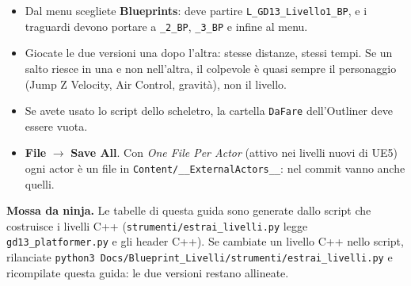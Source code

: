 \documentclass[a4paper,10pt]{article}
\newcommand{\nodo}[1]{\textsf{\textbf{#1}}}
\newcommand{\var}[1]{\texttt{#1}}
\newcommand{\ninja}[1]{\par\smallskip\noindent\colorbox{black!6}{\parbox{\dimexpr\linewidth-2\fboxsep}{\small\textbf{Mossa da ninja.} #1}}\par\smallskip}
\begin{document}
\begin{itemize}
  \item Dal menu scegliete \textbf{Blueprints}: deve partire \var{L\_GD13\_Livello1\_BP}, e i traguardi devono portare a \var{\_2\_BP}, \var{\_3\_BP} e infine al menu.
  \item Giocate le due versioni una dopo l'altra: stesse distanze, stessi tempi. Se un salto riesce in una e non nell'altra, il colpevole è quasi sempre il personaggio (Jump Z Velocity, Air Control, gravità), non il livello.
  \item Se avete usato lo script dello scheletro, la cartella \texttt{DaFare} dell'Outliner deve essere vuota.
  \item \nodo{File} $\rightarrow$ \nodo{Save All}. Con \emph{One File Per Actor} (attivo nei livelli nuovi di UE5) ogni actor è un file in \texttt{Content/\_\_ExternalActors\_\_}: nel commit vanno anche quelli.
\end{itemize}

\ninja{Le tabelle di questa guida sono generate dallo script che costruisce i livelli C++ (\texttt{strumenti/estrai\_livelli.py} legge \texttt{gd13\_platformer.py} e gli header C++). Se cambiate un livello C++ nello script, rilanciate \texttt{python3 Docs/Blueprint\_Livelli/strumenti/estrai\_livelli.py} e ricompilate questa guida: le due versioni restano allineate.}
\end{document}
